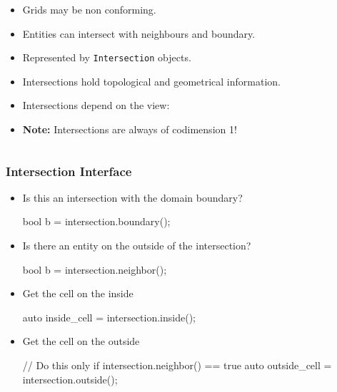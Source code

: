 \documentclass[aspectratio=169,11pt]{beamer}
\theoremstyle{definition}
\begin{document}
\begin{frame}[fragile]

  \begin{columns}
    \begin{column}{0.75\linewidth}
      \begin{itemize}
      \item Grids may be non conforming.
      \item Entities can intersect with neighbours and boundary.
      \item Represented by \lstinline!Intersection! objects.
      \item Intersections hold topological and
        geometrical information.
      \item Intersections depend on the view:
      \item \textbf{Note:} Intersections are always of
        codimension 1!
      \end{itemize}
    \end{column}
    \begin{column}{0.25\linewidth}
      \begin{center}
        \intersections{}
      \end{center}
    \end{column}
  \end{columns}

\end{frame}

\begin{frame}[fragile]
  \frametitle{Intersection Interface}
  \begin{itemize}
  \item Is this an intersection with the domain boundary?
    \begin{cppcode}
bool b = intersection.boundary();
    \end{cppcode}
  \item Is there an entity on the outside of the intersection?
    \begin{cppcode}
bool b = intersection.neighbor();
    \end{cppcode}
  \item Get the cell on the inside
    \begin{cppcode}
auto inside_cell = intersection.inside();
    \end{cppcode}
  \item Get the cell on the outside
    \begin{cppcode}
// Do this only if intersection.neighbor() == true
auto outside_cell = intersection.outside();
    \end{cppcode}
  \end{itemize}

\end{frame}
\end{document}
